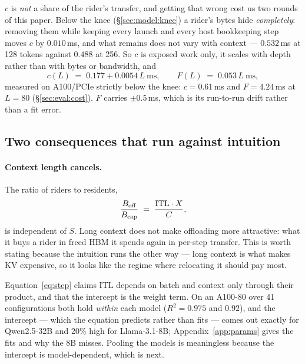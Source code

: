 $c$ is \emph{not} a share of the rider's transfer, and getting that wrong cost us
two rounds of this paper. Below the knee (\S\ref{sec:model:knee}) a rider's bytes
hide \emph{completely}: removing them while keeping every launch and every host
bookkeeping step moves $c$ by $0.010$\,ms, and what remains does not vary with
context --- $0.532$\,ms at 128 tokens against $0.488$ at 256. So $c$ is exposed
work only, it scales with depth rather than with bytes or bandwidth, and
\begin{equation}
\label{eq:coeffs}
c(L) \;=\; 0.177 + 0.0054\,L \ \mathrm{ms},
\qquad
F(L) \;=\; 0.053\,L \ \mathrm{ms},
\end{equation}
measured on A100/PCIe strictly below the knee: $c = 0.61$\,ms and $F = 4.24$\,ms at
$L = 80$ (\S\ref{sec:eval:cost}). $F$ carries $\pm 0.5$\,ms, which is its
run-to-run drift rather than a fit error.

\subsection{Two consequences that run against intuition}
\label{sec:model:cancel}

\paragraph{Context length cancels.} The ratio of riders to residents,
%
\begin{equation}
\label{eq:cancel}
\frac{B_{\mathrm{off}}}{B_{\mathrm{cap}}}
  \;=\; \frac{\mathrm{ITL}\cdot X}{C},
\end{equation}
%
is independent of $S$. Long context does not make offloading more attractive: what
it buys a rider in freed HBM it spends again in per-step transfer. This is worth
stating because the intuition runs the other way --- long context is what makes KV
expensive, so it looks like the regime where relocating it should pay most.

Equation~\ref{eq:step} claims ITL depends on batch and context only through their
product, and that the intercept is the weight term. On an A100-80 over 41
configurations both hold \emph{within} each model ($R^2 = 0.975$ and $0.92$), and
the intercept --- which the equation predicts rather than fits --- comes out exactly
for Qwen2.5-32B and 20\% high for Llama-3.1-8B; Appendix~\ref{app:params} gives the
fits and why the 8B misses. Pooling the models is meaningless because the intercept
is model-dependent, which is next.

